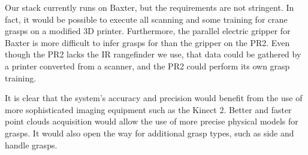 \documentclass{article}
\begin{document}

Our stack currently runs on Baxter, but the requirements are not
stringent.  In fact, it would be possible to execute all scanning and
some training for crane grasps on a modified 3D printer. Furthermore,
the parallel electric gripper for Baxter is more difficult to infer
grasps for than the gripper on the PR2.  Even though the PR2 lacks the
IR rangefinder we use, that data could be gathered by a printer
converted from a scanner, and the PR2 could perform its own grasp
training.

It is clear that the system's accuracy and precision would benefit
from the use of more sophisticated imaging equipment such as the
Kinect 2. Better and faster point clouds acquisition would allow the
use of more precise physical models for grasps. It would also open the
way for additional grasp types, such as side and handle grasps.



{\tiny


}
\end{document}
